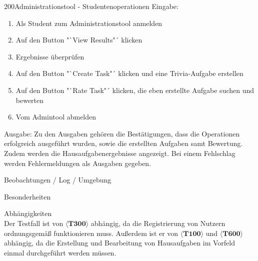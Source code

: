 \begin{testcase}{200}{Administrationstool - Studentenoperationen}
Eingabe:
\begin{enumerate}
\item Als Student zum Administrationstool anmelden
\item Auf den Button "`View Results"´ klicken
\item Ergebnisse überprüfen
\item Auf den Button "`Create Task"´ klicken und eine Trivia-Aufgabe erstellen
\item Auf den Button "`Rate Task"´ klicken, die eben erstellte Aufgabe suchen und bewerten
\item Vom Admintool abmelden
\end{enumerate}
Ausgabe:
Zu den Ausgaben gehören die Bestätigungen, dass die Operationen erfolgreich ausgeführt wurden, sowie die erstellten Aufgaben samt Bewertung. Zudem werden die Hausaufgabenergebnisse angezeigt. 
Bei einem Fehlschlag werden Fehlermeldungen als Ausgaben gegeben.

\item[Beobachtungen / Log / Umgebung]~\\


\item[Besonderheiten]~\\

\item[Abhängigkeiten]~\\
Der Testfall ist von $\langle\textbf{T300}\rangle$ abhängig, da die Registrierung von Nutzern ordnungsgemäß funktionieren muss.
Außerdem ist er von $\langle\textbf{T100}\rangle$ und $\langle\textbf{T600}\rangle$ abhängig, da die Erstellung und Bearbeitung von Hausaufgaben im Vorfeld einmal durchgeführt werden müssen.

\end{testcase}

